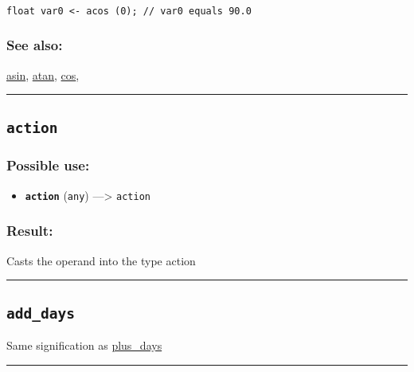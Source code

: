 \documentclass[]{book}
\providecommand{\tightlist}{%
  \setlength{\itemsep}{0pt}\setlength{\parskip}{0pt}}
\theoremstyle{definition}
\theoremstyle{definition}
\theoremstyle{definition}
\theoremstyle{remark}
\begin{document}
\begin{verbatim}
 
float var0 <- acos (0); // var0 equals 90.0
\end{verbatim}

\subsubsection{See also:}\label{see-also-15}

\href{OperatorsAA\#asin}{asin}, \href{OperatorsAA\#atan}{atan},
\href{OperatorsBC\#cos}{cos},

\begin{center}\rule{0.5\linewidth}{\linethickness}\end{center}

\subsection{\texorpdfstring{\texttt{action}}{action}}\label{action}

\subsubsection{Possible use:}\label{possible-use-19}

\begin{itemize}
\tightlist
\item
  \textbf{\texttt{action}} (\texttt{any}) ---\textgreater{}
  \texttt{action}
\end{itemize}

\subsubsection{Result:}\label{result-18}

Casts the operand into the type action

\begin{center}\rule{0.5\linewidth}{\linethickness}\end{center}

\subsection{\texorpdfstring{\texttt{add\_days}}{add\_days}}\label{add_days}

Same signification as \href{OperatorsNR\#plus_days}{plus\_days}

\begin{center}\rule{0.5\linewidth}{\linethickness}\end{center}
\end{document}
